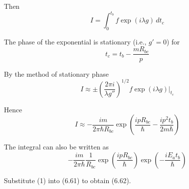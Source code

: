 \documentclass[12pt]{article}
\begin{document}
Then
\begin{equation*}
I=\int_0^{t_b}f\exp(i\lambda g)\,dt_c
\end{equation*}

The phase of the exponential is stationary (i.e., $g'=0$) for
\begin{equation*}
t_c=t_b-\frac{mR_{bc}}{p}
\end{equation*}

By the method of stationary phase
\begin{equation*}
I\approx\pm\left(\frac{2\pi i}{\lambda g''}\right)^{1/2}
f\exp(i\lambda g)\bigg|_{t_c}
\end{equation*}

Hence
\begin{equation*}
I\approx-\frac{im}{2\pi\hbar R_{bc}}
\exp\left(\frac{ipR_{bc}}{\hbar}-\frac{ip^2t_b}{2m\hbar}\right)
\end{equation*}

The integral can also be written as
\begin{equation*}
-\frac{im}{2\pi\hbar}
\frac{1}{R_{bc}}
\exp\left(\frac{ipR_{bc}}{\hbar}\right)
\exp\left(-\frac{iE_at_b}{\hbar}\right)
\tag{1}
\end{equation*}

Substitute (1) into (6.61) to obtain (6.62).
\end{document}
